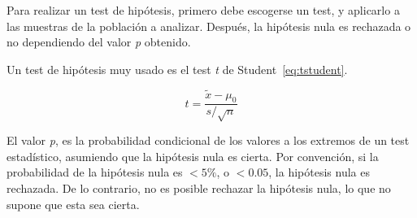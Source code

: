 Para realizar un test de hipótesis,
primero debe escogerse un test,
y aplicarlo a las muestras de la población a analizar.
Después, la hipótesis nula es rechazada o no dependiendo
del valor \textit{p} obtenido.

Un test de hipótesis muy usado es el test \textit{t}
de Student~\eqref{eq:tstudent}.

\begin{equation}
	t = \frac{\tilde{x} - \mu_0}{s / \sqrt{n}}
	\label{eq:tstudent}
\end{equation}

El valor \textit{p}, es la probabilidad condicional de
los valores a los extremos de un test estadístico,
asumiendo que la hipótesis nula es cierta.
Por convención, si la probabilidad de la hipótesis nula es $<5\%$, o $<0.05$,
la hipótesis nula es rechazada.
De lo contrario, no es posible rechazar la hipótesis nula,
lo que no supone que esta sea cierta.
